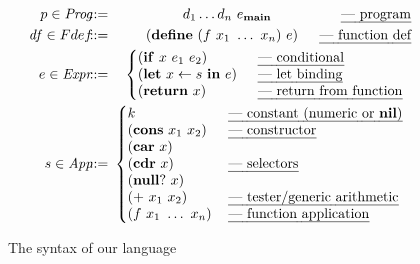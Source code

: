 \documentclass[9pt]{sigplanconf}
\newcommand{\ID}{\mbox{$\mathbf{ id}$}}
\begin{document}
\begin{figure}[t]
\renewcommand{\arraystretch}{1.2}
\begin{eqnarray*}
   p \in \mathit{Prog} & \!\!\!::=\!\!\! & d_1 \ldots d_n \,\, e_\mainpgm
    \hspace{5em} \mbox{\em --- program}\\
    \mathit{df} \in Fdef & \!\!\!::=\!\!\! & (\DEFINE\,\, (f\,\, x_1 \,\, \ldots
\,\,x_n)\,\,
    e)
    \hspace{0.2em} \ \ \ \ \mbox{\em --- function def} \\
e \in \mathit{Expr} & \!\!\!::=\!\!\! &
\left\{\begin{array}{@{}ll@{\hspace{1em}}l}
       (\SIF\,\, x\,\, e_1\,\, e_2) && \!\!\!\mbox{\em --- conditional} \\
       (\LET\,\, x \leftarrow s\,\, \IN\,\, e) &&\!\!\! \mbox{\em --- let
binding} \\
       (\SRETURN\,\, x) && \!\!\!\mbox{\em --- return from function}
    \end{array}\right. \\
s \in \mathit{App} & \!\!\!::=\!\!\!  &
\left\{\begin{array}{@{}l@{\hspace{1.2em}}l}
       k & \mbox{\em --- constant (numeric or $\NIL$)}\\
       (\CONS\,\, x_1\,\, x_2) & \mbox{\em --- constructor} \\
       (\CAR\,\, x) & \\
       (\CDR\,\, x) & \mbox{\em --- selectors} \\
       (\NULLQ\,\, x) & \\
       (\PRIM\,\, x_1\,\, x_2) & \mbox{\em ---  tester/generic arithmetic} \\
       (f\,\, x_1\,\,\ldots\,\, x_n) & \mbox{\em --- function application}
    \end{array}\right.
\end{eqnarray*}
  \caption{The syntax of our language}\label{fig:lang-syntax}
\figrule
\normalsize
\end{figure}
\end{document}

